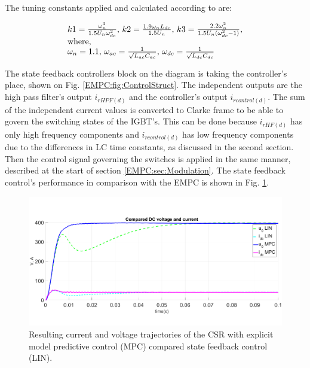     The tuning constants applied and calculated according to \cite{godlewska2015predictive} are:

    \begin{equation}
        \begin{array}{l}
            k1=\frac{\omega^3_n}{1.5U_n\omega^2_{dc}},\,k2=\frac{1.9\omega_n L_{dc}}{1.5U_n},\,k3=\frac{2.2\omega^2_n}{1.5U_n(\omega^2_{dc}-1)},\\
            \textnormal{where,}\\
            \omega_n=1.1,\,\omega_{ac}=\frac{1}{\sqrt{L_{ac}C_{ac}}},\,\omega_{dc}=\frac{1}{\sqrt{L_{dc}C_{dc}}}
        \end{array}
        \label{EMPC:equ:tuning}
    \end{equation}

    The state feedback controllers block on the diagram is taking the controller's place, shown on Fig. \ref{EMPC:fig:ControlStruct}. The independent outputs are the high pass filter's output  $i_{rHPF(d)}$ and the controller's output $i_{rcontrol(d)}$. The sum of the independent current values is converted to Clarke frame to be able to govern the switching states of the IGBT's. This can be done because $i_{rHF(d)}$ has only high frequency components and $i_{rcontrol(d)}$ has low frequency components due to the differences in LC time constants, as discussed in the second section. Then the control signal governing the switches is applied in the same manner, described at the start of section \ref{EMPC:sec:Modulation}.
    The state feedback control's performance in comparison with the EMPC is shown in Fig. \ref{EMPC:fig:Result_EMPCfinal}.

    \begin{figure}[!ht]
        \centering
        \includegraphics[width=\textwidth]{EMPC_PNG_Pics/Result_EMPCfinal.png}
        \caption{Resulting current and voltage trajectories of the CSR with explicit model predictive control (MPC) compared state feedback control (LIN).}
        \label{EMPC:fig:Result_EMPCfinal}
    \end{figure}


